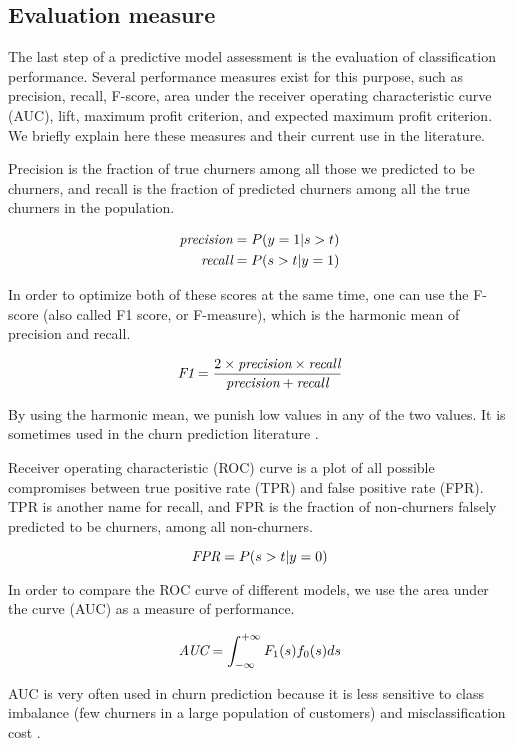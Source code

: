 \subsection{Evaluation measure}

The last step of a predictive model assessment is the evaluation of
classification performance. Several performance measures exist for this purpose,
such as precision, recall, F-score, area under the receiver operating
characteristic curve (AUC), lift, maximum profit criterion, and expected maximum
profit criterion. We briefly explain here these measures and their current use
in the literature.

Precision is the fraction of true churners among all those we predicted to be
churners, and recall is the fraction of predicted churners among all the true
churners in the population.

\begin{align*}
    \textit{precision} &= P(y=1|s>t)\\
    \textit{recall}    &= P(s>t|y=1)
\end{align*}

In order to optimize both of these scores at the same time, one can use the
F-score (also called F1 score, or F-measure), which is the harmonic mean of
precision and recall.

\[\textit{F1} = \frac{2\times \textit{precision} \times \textit{recall}}{\textit{precision} + \textit{recall}}\]

By using the harmonic mean, we punish low values in any of the two values. It is
sometimes used in the churn prediction literature \parencite{ahmed2017churn,
keramati2014improved}.

Receiver operating characteristic (ROC) curve \parencite{krzanowski2009roc} is a
plot of all possible compromises between true positive rate (TPR) and false
positive rate (FPR). TPR is another name for recall, and FPR is the fraction of
non-churners falsely predicted to be churners, among all non-churners.

\[\textit{FPR}=P(s>t|y=0)\]

In order to compare the ROC curve of different models, we use the area under the
curve (AUC) as a measure of performance.

\[\textit{AUC}=\int_{-\infty}^{+\infty}F_1(s)f_0(s)ds\]

AUC is very often used in churn prediction \parencite{coussement2017comparative,
mitrovic2018operational} because it is less sensitive to class imbalance (few
churners in a large population of customers) and misclassification cost
\parencite{verbeke2012new}.

